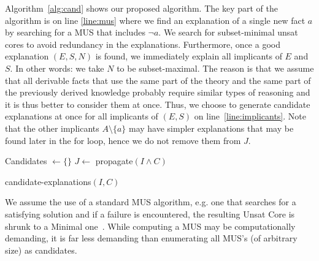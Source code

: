 Algorithm~\ref{alg:cand} shows our proposed algorithm. The key part of the algorithm is on line \ref{line:mus} where we find an explanation of a single new fact $a$ by searching for a MUS that includes $\neg a$.
We search for subset-minimal unsat cores to avoid redundancy in the explanations.
Furthermore, once a good explanation $(E,S,N)$ is found, we immediately explain all implicants of $E$ and $S$. In other words: we take $N$ to be subset-maximal. 
The reason is that we assume that all derivable facts that use the same part of the theory and the same part of the previously derived knowledge probably require similar types of reasoning and it is thus better to consider them at once. 
Thus, we choose to generate candidate explanations at once for all implicants of $(E, S)$ on line~\ref{line:implicants}. 
Note that the other implicants $A \setminus \{a\}$ may have simpler explanations that may be found later in the for loop, hence we do not remove them from $J$.

\begin{algorithm}
% 

% 

  Candidates $\gets \{\}$\;
  $J \gets$ propagate$(I \wedge C)$\;
\caption{candidate-explanations$(I,C)$}

\label{alg:cand}
\end{algorithm}


We assume the use of a standard MUS algorithm, e.g. one that searches for a satisfying solution and if a failure is encountered, the resulting Unsat Core is shrunk to a Minimal one~\cite{marques2010minimal}. While computing a MUS may be computationally demanding, it is far less demanding than enumerating all MUS's (of arbitrary size) as candidates. 


